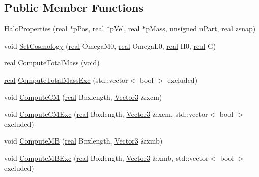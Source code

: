 \subsection*{Public Member Functions}
\begin{DoxyCompactItemize}
\item 
\hyperlink{classHaloProperties_abee7f4c745501bce6db44b07ceb8f276}{HaloProperties} (\hyperlink{Global_8h_a031f8951175b43076c2084a6c2173410}{real} $\ast$pPos, \hyperlink{Global_8h_a031f8951175b43076c2084a6c2173410}{real} $\ast$pVel, \hyperlink{Global_8h_a031f8951175b43076c2084a6c2173410}{real} $\ast$pMass, unsigned nPart, \hyperlink{Global_8h_a031f8951175b43076c2084a6c2173410}{real} zsnap)
\item 
void \hyperlink{classHaloProperties_ad5ba044f05cff83ef00e69f3b4aef0af}{SetCosmology} (\hyperlink{Global_8h_a031f8951175b43076c2084a6c2173410}{real} OmegaM0, \hyperlink{Global_8h_a031f8951175b43076c2084a6c2173410}{real} OmegaL0, \hyperlink{Global_8h_a031f8951175b43076c2084a6c2173410}{real} H0, \hyperlink{Global_8h_a031f8951175b43076c2084a6c2173410}{real} G)
\item 
\hyperlink{Global_8h_a031f8951175b43076c2084a6c2173410}{real} \hyperlink{classHaloProperties_a06a1cd86f4973cd6c81b47a5712fcac8}{ComputeTotalMass} (void)
\item 
\hyperlink{Global_8h_a031f8951175b43076c2084a6c2173410}{real} \hyperlink{classHaloProperties_af1a876c4064a4e86f74d3585b6f68030}{ComputeTotalMassExc} (std::vector$<$ bool $>$ excluded)
\item 
void \hyperlink{classHaloProperties_a37814d4c30aea13d79fac7f214c1bcb4}{ComputeCM} (\hyperlink{Global_8h_a031f8951175b43076c2084a6c2173410}{real} Boxlength, \hyperlink{classVector3}{Vector3} \&xcm)
\item 
void \hyperlink{classHaloProperties_a79438fc145a289259c5f0f9ccd40885a}{ComputeCMExc} (\hyperlink{Global_8h_a031f8951175b43076c2084a6c2173410}{real} Boxlength, \hyperlink{classVector3}{Vector3} \&xcm, std::vector$<$ bool $>$ excluded)
\item 
void \hyperlink{classHaloProperties_aabd66cd248656d59603f8b595a22ce17}{ComputeMB} (\hyperlink{Global_8h_a031f8951175b43076c2084a6c2173410}{real} Boxlength, \hyperlink{classVector3}{Vector3} \&xmb)
\item 
void \hyperlink{classHaloProperties_aff8caa920de95062ee0b89e955cd49d7}{ComputeMBExc} (\hyperlink{Global_8h_a031f8951175b43076c2084a6c2173410}{real} Boxlength, \hyperlink{classVector3}{Vector3} \&xmb, std::vector$<$ bool $>$ excluded)
\item 

\end{DoxyCompactItemize}
